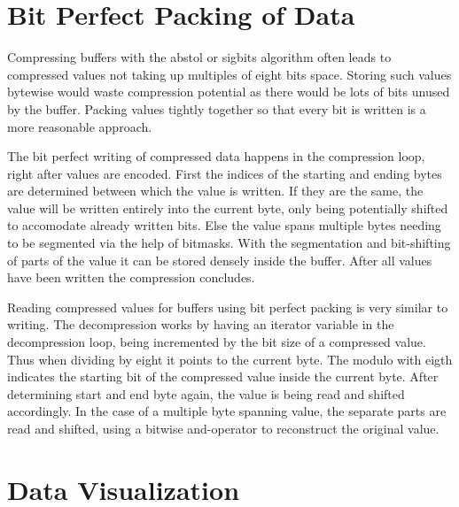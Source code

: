 \documentclass[
	12pt,
	a4paper,
	BCOR10mm,
	DIV14,
	headsepline,
]{scrreprt}
\begin{document}
\chapter{Bit Perfect Packing of Data}
\label{bit_perf}

\bigskip

Compressing buffers with the abstol or sigbits algorithm often leads to
compressed values not taking up multiples of eight bits space. Storing such
values bytewise would waste compression potential as there would be lots of
bits unused by the buffer. Packing values tightly together so that every bit
is written is a more reasonable approach. \par
The bit perfect writing of compressed data happens in the compression loop,
right after values are encoded. First the indices of the starting and ending
bytes are determined between which the value is written. If they are the same, the
value will be written entirely into the current byte, only being potentially
shifted to accomodate already written bits. Else the value spans multiple
bytes needing to be segmented via the help of bitmasks. With the segmentation
and bit-shifting of parts of the value it can be stored densely inside the
buffer. After all values have been written the compression concludes. \par
Reading compressed values for buffers using bit perfect packing is very
similar to writing. The decompression works by having an iterator variable in
the decompression loop, being incremented by the bit size of a compressed value.
Thus when dividing by eight it points to the current byte. The modulo with
eigth indicates the starting bit of the compressed value inside the current
byte. After determining start and end byte again, the value is being read and
shifted accordingly. In the case of a multiple byte spanning value, the separate
parts are read and shifted, using a bitwise and-operator to reconstruct the
original value.

\chapter{Data Visualization}

\bigskip
\end{document}

